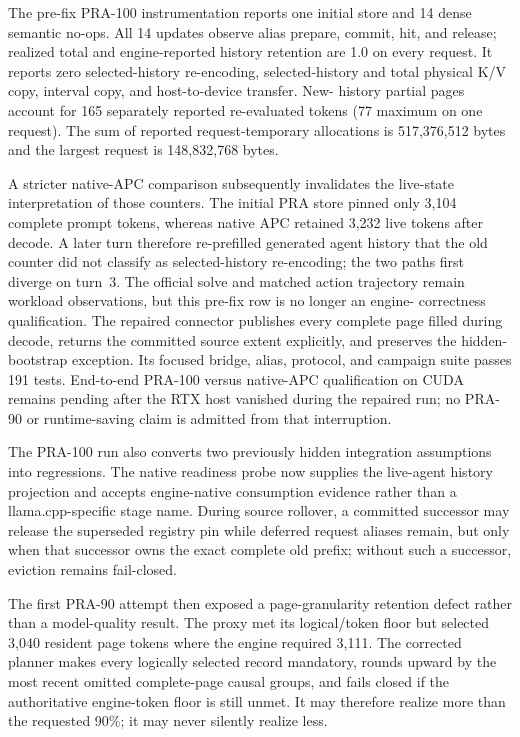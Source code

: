 \documentclass[11pt]{article}
\begin{document}
The pre-fix PRA-100 instrumentation reports one initial store and 14 dense
semantic no-ops.  All 14 updates observe alias prepare, commit, hit, and
release; realized total and engine-reported history retention are 1.0 on every
request.  It reports zero selected-history re-encoding, selected-history and
total physical K/V copy, interval copy, and host-to-device transfer.  New-
history partial pages account for 165 separately reported re-evaluated tokens
(77 maximum on one request).  The sum of reported request-temporary
allocations is 517,376,512 bytes and the largest request is 148,832,768 bytes.

A stricter native-APC comparison subsequently invalidates the live-state
interpretation of those counters.  The initial PRA store pinned only 3,104
complete prompt tokens, whereas native APC retained 3,232 live tokens after
decode.  A later turn therefore re-prefilled generated agent history that the
old counter did not classify as selected-history re-encoding; the two paths
first diverge on turn~3.  The official solve and matched action trajectory
remain workload observations, but this pre-fix row is no longer an engine-
correctness qualification.  The repaired connector publishes every complete
page filled during decode, returns the committed source extent explicitly,
and preserves the hidden-bootstrap exception.  Its focused bridge, alias,
protocol, and campaign suite passes 191 tests.  End-to-end PRA-100 versus
native-APC qualification on CUDA remains pending after the RTX host vanished
during the repaired run; no PRA-90 or runtime-saving claim is admitted from
that interruption.

The PRA-100 run also converts two previously hidden integration assumptions into
regressions.  The native readiness probe now supplies the live-agent history
projection and accepts engine-native consumption evidence rather than a
llama.cpp-specific stage name.  During source rollover, a committed successor
may release the superseded registry pin while deferred request aliases remain,
but only when that successor owns the exact complete old prefix; without such
a successor, eviction remains fail-closed.

The first PRA-90 attempt then exposed a page-granularity retention defect rather
than a model-quality result.  The proxy met its logical/token floor but selected
3,040 resident page tokens where the engine required 3,111.  The corrected
planner makes every logically selected record mandatory, rounds upward by the
most recent omitted complete-page causal groups, and fails closed if the
authoritative engine-token floor is still unmet.  It may therefore realize more
than the requested 90\%; it may never silently realize less.
\end{document}
